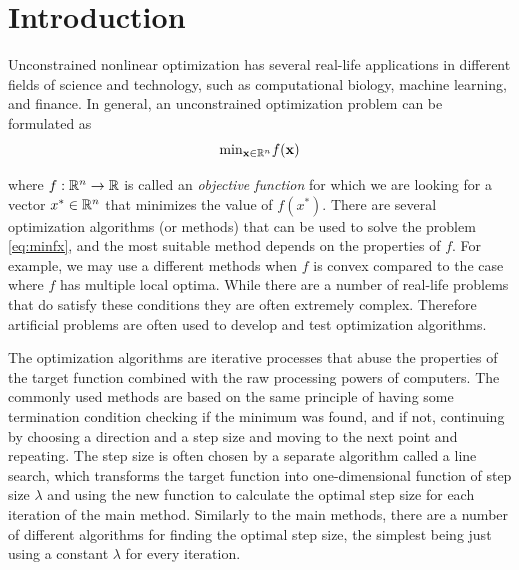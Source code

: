 \documentclass[a4paper,english,titlepage,12pt]{article}
\newcommand{\vect}[1]{\ensuremath{\mathbf{#1}}}
\newcommand{\R}{\ensuremath\mathbb{R}}
\begin{document}
\section{Introduction}

Unconstrained nonlinear optimization has several real-life applications in different fields of science and technology, such as computational biology, machine learning, and finance.
In general, an unconstrained optimization problem can be formulated as
\begin{equation}\label{eq:minfx}
    \mathrm{min}_{\vect{x} \in \R^n} f(\vect{x})
\end{equation}

where $f : \R^n \rightarrow \R$ is called an \emph{objective function} for which we are looking for a vector $x^* \in \R^n$ that minimizes the value of $f(x^*)$. There are several optimization algorithms (or methods) that can be used to solve the problem \eqref{eq:minfx}, and the most suitable method depends on the properties of $f$. For example, we may use a different methods when $f$ is convex compared to the case where $f$ has multiple local optima.  
While there are a number of real-life problems that do satisfy these conditions they are often extremely complex. Therefore artificial problems are often used to develop and test optimization algorithms. \cite{test_function_collection_artifical}

The optimization algorithms are iterative processes that abuse the properties of the target function combined with the raw processing powers of computers. The commonly used methods are based on the same principle of having some termination condition checking if the minimum was found, and if not, continuing by choosing a direction and a step size and moving to the next point and repeating. The step size is often chosen by a separate algorithm called a line search, which transforms the target function into one-dimensional function of step size $\lambda$ and using the new function to calculate the optimal step size for each iteration of the main method. Similarly to the main methods, there are a number of different algorithms for finding the optimal step size, the simplest being just using a constant $\lambda$ for every iteration.
\end{document}
